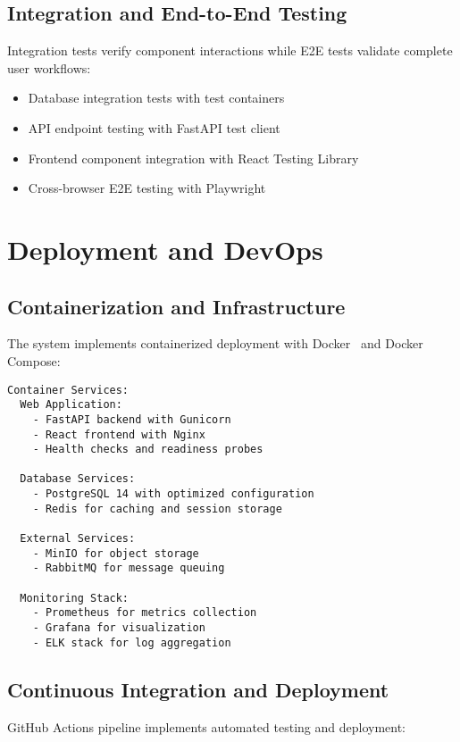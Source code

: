 \documentclass[a4paper,12pt,oneside]{book}
\begin{document}
\section{Integration and End-to-End Testing}

Integration tests verify component interactions while E2E tests validate complete user workflows:

\begin{itemize}
    \item Database integration tests with test containers
    \item API endpoint testing with FastAPI test client
    \item Frontend component integration with React Testing Library
    \item Cross-browser E2E testing with Playwright
\end{itemize}

\chapter{Deployment and DevOps}
\section{Containerization and Infrastructure}

The system implements containerized deployment with Docker~\cite{docker} and Docker Compose:

\begin{lstlisting}[language=Pseudocode, caption=Container Architecture]
Container Services:
  Web Application:
    - FastAPI backend with Gunicorn
    - React frontend with Nginx
    - Health checks and readiness probes
    
  Database Services:
    - PostgreSQL 14 with optimized configuration
    - Redis for caching and session storage
    
  External Services:
    - MinIO for object storage
    - RabbitMQ for message queuing
    
  Monitoring Stack:
    - Prometheus for metrics collection
    - Grafana for visualization
    - ELK stack for log aggregation
\end{lstlisting}

\section{Continuous Integration and Deployment}

GitHub Actions pipeline implements automated testing and deployment:
\end{document}
